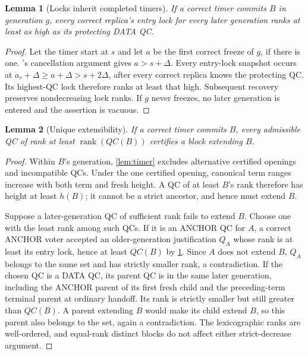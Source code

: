 \documentclass[11pt,a4paper]{article}
\newcommand{\rank}{\operatorname{rank}}
\newtheorem{lemma}[lemma]{Lemma}
\begin{document}
\begin{lemma}[Locks inherit completed timers]
\label{lem:locks}
If a correct timer commits $B$ in generation $g$, every correct replica's
entry lock for every later generation ranks at least as high as its
protecting DATA QC.
\end{lemma}
\begin{proof}
Let the timer start at $s$ and let $a$ be the first correct freeze of $g$,
if there is one. 's cancellation argument gives
$a>s+\Delta$. Every entry-lock snapshot occurs at
$a_r+\Delta\ge a+\Delta>s+2\Delta$, after every correct replica knows the
protecting QC. Its highest-QC lock therefore ranks at least that high.
Subsequent recovery preserves nondecreasing lock ranks. If $g$ never
freezes, no later generation is entered and the assertion is vacuous.
\end{proof}

\begin{lemma}[Unique extensibility]
\label{lem:extend}
If a correct timer commits $B$, every admissible QC of rank at least
$\rank(QC(B))$ certifies a block extending $B$.
\end{lemma}
\begin{proof}
Within $B$'s generation, \cref{lem:timer} excludes alternative certified
openings and incompatible QCs. Under the one certified opening, canonical
term ranges increase with both term and fresh height. A QC of at least
$B$'s rank therefore has height at least $h(B)$; it cannot be a strict
ancestor, and hence must extend $B$.

Suppose a later-generation QC of sufficient rank fails to extend $B$.
Choose one with the least rank among such QCs. If it is an ANCHOR QC for
$A$, a correct ANCHOR voter accepted an older-generation justification
$Q_A$ whose rank is at least its entry lock, hence at least $QC(B)$ by
\cref{lem:locks}. Since $A$ does not extend $B$, $Q_A$ belongs to the
same set and has strictly smaller rank, a contradiction.
If the chosen QC is a DATA QC, its parent QC is in the same later
generation, including the ANCHOR parent of its first fresh child and the
preceding-term terminal parent at ordinary handoff. Its rank is strictly
smaller but still greater than $QC(B)$. A parent extending $B$ would make
its child extend $B$, so this parent also belongs to the set, again a
contradiction. The lexicographic ranks are well-ordered, and equal-rank
distinct blocks do not affect either strict-decrease argument.
\end{proof}
\end{document}
